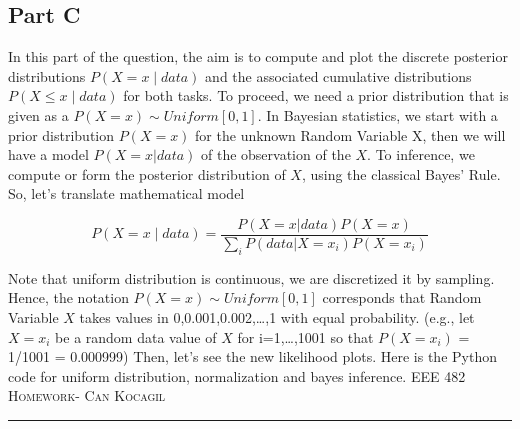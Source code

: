 \documentclass[12pt]{amsart}
\begin{document}
\subsection{Part C}
In this part of the question, the aim is to compute and plot the discrete posterior distributions $P(X=x\mid data)$ and the associated cumulative distributions $P(X\leq x\mid data)$ for both tasks. To proceed, we need a prior distribution that is given as a $P(X=x) \sim Uniform[0,1]$. In Bayesian statistics, we start with a prior distribution $P(X=x)$ for the unknown Random Variable X, then we will have a model $P(X=x|data)$ of the observation of the $X$. To inference, we compute or form the posterior distribution of $X$, using the classical Bayes’ Rule. So, let’s translate mathematical model





\begin{equation}
P(X=x \mid data) = \frac{P(X=x|data)P(X=x)}{\sum_{i}^{} P(data|X=x_i)P(X=x_i) }
\end{equation}

Note that uniform distribution is continuous, we are discretized it by sampling. Hence, the notation $P(X=x) \sim Uniform[0,1]$ corresponds that Random Variable $X$ takes values in {0,0.001,0.002,…,1} with equal probability. (e.g., let $X=x_i$ be a random data value of $X$ for i=1,…,1001 so that $P(X=x_i)$ = 1/1001 = 0.000999) Then, let’s see the new likelihood plots. Here is the Python code for uniform distribution, normalization and bayes inference.
\newpage
{\scshape EEE 482} \hfill {\scshape \large  Homework-\relax} \hfill {\scshape Can Kocagil}
\smallskip
\hrule

\vspace{8mm}
\end{document}
